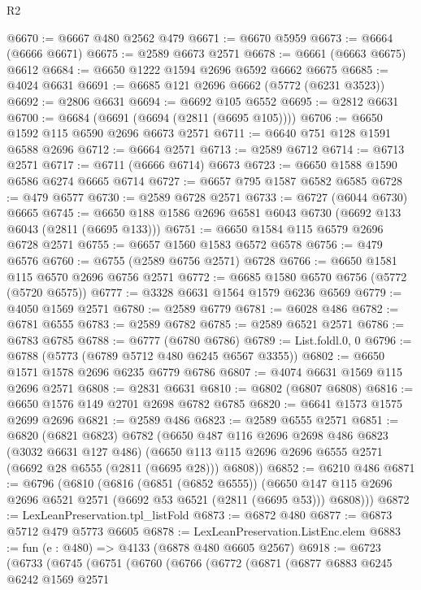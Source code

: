 \begin{lexlean}{R2}
\begin{coremodule}
@6670 := @6667 @480 @2562 @479
@6671 := @6670 @5959
@6673 := @6664 (@6666 @6671)
@6675 := @2589 @6673 @2571
@6678 := @6661 (@6663 @6675) @6612
@6684 := @6650 @1222 @1594 @2696 @6592 @6662 @6675
@6685 := @4024 @6631
@6691 := @6685 @121 @2696 @6662 (@5772 (@6231 @3523))
@6692 := @2806 @6631
@6694 := @6692 @105 @6552
@6695 := @2812 @6631
@6700 := @6684 (@6691 (@6694 (@2811 (@6695 @105))))
@6706 := @6650 @1592 @115 @6590 @2696 @6673 @2571
@6711 := @6640 @751 @128 @1591 @6588 @2696
@6712 := @6664 @2571
@6713 := @2589 @6712
@6714 := @6713 @2571
@6717 := @6711 (@6666 @6714) @6673
@6723 := @6650 @1588 @1590 @6586 @6274 @6665 @6714
@6727 := @6657 @795 @1587 @6582 @6585
@6728 := @479 @6577
@6730 := @2589 @6728 @2571
@6733 := @6727 (@6044 @6730) @6665
@6745 := @6650 @188 @1586 @2696 @6581 @6043 @6730 (@6692 @133 @6043 (@2811 (@6695 @133)))
@6751 := @6650 @1584 @115 @6579 @2696 @6728 @2571
@6755 := @6657 @1560 @1583 @6572 @6578
@6756 := @479 @6576
@6760 := @6755 (@2589 @6756 @2571) @6728
@6766 := @6650 @1581 @115 @6570 @2696 @6756 @2571
@6772 := @6685 @1580 @6570 @6756 (@5772 (@5720 @6575))
@6777 := @3328 @6631 @1564 @1579 @6236 @6569
@6779 := @4050 @1569 @2571
@6780 := @2589 @6779
@6781 := @6028 @486
@6782 := @6781 @6555
@6783 := @2589 @6782
@6785 := @2589 @6521 @2571
@6786 := @6783 @6785
@6788 := @6777 (@6780 @6786)
@6789 := List.foldl.{0, 0}
@6796 := @6788 (@5773 (@6789 @5712 @480 @6245 @6567 @3355))
@6802 := @6650 @1571 @1578 @2696 @6235 @6779 @6786
@6807 := @4074 @6631 @1569 @115 @2696 @2571
@6808 := @2831 @6631
@6810 := @6802 (@6807 @6808)
@6816 := @6650 @1576 @149 @2701 @2698 @6782 @6785
@6820 := @6641 @1573 @1575 @2699 @2696
@6821 := @2589 @486
@6823 := @2589 @6555 @2571
@6851 := @6820
    (@6821 @6823)
    @6782
    (@6650
      @487
      @116
      @2696
      @2698
      @486
      @6823
      (@3032 @6631 @127 @486)
      (@6650 @113 @115 @2696 @2696 @6555 @2571 (@6692 @28 @6555 (@2811 (@6695 @28))) @6808))
@6852 := @6210 @486
@6871 := @6796
    (@6810
      (@6816
        (@6851 (@6852 @6555))
        (@6650 @147 @115 @2696 @2696 @6521 @2571 (@6692 @53 @6521 (@2811 (@6695 @53))) @6808)))
@6872 := LexLeanPreservation.tpl_listFold
@6873 := @6872 @480
@6877 := @6873 @5712 @479 @5773 @6605
@6878 := LexLeanPreservation.ListEnc.elem
@6883 := fun (e : @480) => @4133 (@6878 @480 @6605 @2567)
@6918 := @6723
    (@6733
      (@6745
        (@6751
          (@6760
            (@6766
              (@6772
                (@6871
                  (@6877
                    @6883
                    @6245
                    @6242
                    @1569
                    @2571

\end{coremodule}
\end{lexlean}
